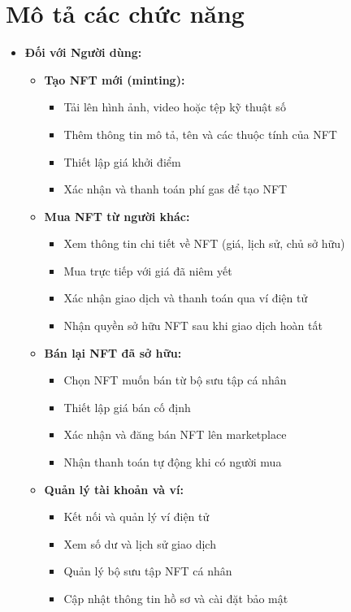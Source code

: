 \section{Mô tả các chức năng}
\begin{itemize}
    \item \textbf{Đối với Người dùng:}
    \begin{itemize}
        \item \textbf{Tạo NFT mới (minting):}
        \begin{itemize}
            \item Tải lên hình ảnh, video hoặc tệp kỹ thuật số
            \item Thêm thông tin mô tả, tên và các thuộc tính của NFT
            \item Thiết lập giá khởi điểm
            \item Xác nhận và thanh toán phí gas để tạo NFT
        \end{itemize}
        
        \item \textbf{Mua NFT từ người khác:}
        \begin{itemize}
            \item Xem thông tin chi tiết về NFT (giá, lịch sử, chủ sở hữu)
            \item Mua trực tiếp với giá đã niêm yết
            \item Xác nhận giao dịch và thanh toán qua ví điện tử
            \item Nhận quyền sở hữu NFT sau khi giao dịch hoàn tất
        \end{itemize}
        
        \item \textbf{Bán lại NFT đã sở hữu:}
        \begin{itemize}
            \item Chọn NFT muốn bán từ bộ sưu tập cá nhân
            \item Thiết lập giá bán cố định
            \item Xác nhận và đăng bán NFT lên marketplace
            \item Nhận thanh toán tự động khi có người mua
        \end{itemize}
        
        \item \textbf{Quản lý tài khoản và ví:}
        \begin{itemize}
            \item Kết nối và quản lý ví điện tử
            \item Xem số dư và lịch sử giao dịch
            \item Quản lý bộ sưu tập NFT cá nhân
            \item Cập nhật thông tin hồ sơ và cài đặt bảo mật
        \end{itemize}
        

\end{itemize}
\end{itemize}

